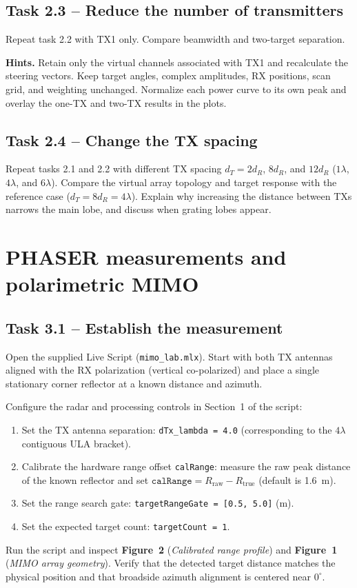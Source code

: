 \documentclass[11pt,a4paper]{article}
\newcommand{\task}[2]{\subsection*{Task #1 -- #2}}
\begin{document}
\task{2.3}{Reduce the number of transmitters}
Repeat task 2.2 with TX1 only. Compare beamwidth and two-target separation.

\textbf{Hints.} Retain only the virtual channels associated with TX1 and
recalculate the steering vectors. Keep target angles, complex amplitudes, RX
positions, scan grid, and weighting unchanged. Normalize each power curve to
its own peak and overlay the one-TX and two-TX results in the plots.

\task{2.4}{Change the TX spacing}
Repeat tasks 2.1 and 2.2 with different TX spacing $d_T=2d_R$, $8d_R$, and $12d_R$ ($1\lambda$, $4\lambda$, and $6\lambda$).
Compare the virtual array topology and target response with the reference case ($d_T=8d_R=4\lambda$). Explain why increasing the distance between TXs narrows the main lobe, and discuss when grating lobes appear.



\section{PHASER measurements and polarimetric MIMO}

\task{3.1}{Establish the measurement}
Open the supplied Live Script (\texttt{mimo\_lab.mlx}). Start with both TX antennas aligned with the RX polarization (vertical co-polarized) and place a single stationary corner reflector at a known distance and azimuth.

Configure the radar and processing controls in Section~1 of the script:
\begin{enumerate}
\item Set the TX antenna separation: \texttt{dTx\_lambda = 4.0} (corresponding to the $4\lambda$ contiguous ULA bracket).
\item Calibrate the hardware range offset \texttt{calRange}: measure the raw peak distance of the known reflector and set $\texttt{calRange} = R_{\text{raw}} - R_{\text{true}}$ (default is 1.6~m).
\item Set the range search gate: \texttt{targetRangeGate = [0.5, 5.0]} (m).
\item Set the expected target count: \texttt{targetCount = 1}.
\end{enumerate}

Run the script and inspect \textbf{Figure~2} (\textit{Calibrated range profile}) and \textbf{Figure~1} (\textit{MIMO array geometry}). Verify that the detected target distance matches the physical position and that broadside azimuth alignment is centered near $0^\circ$.
\end{document}
